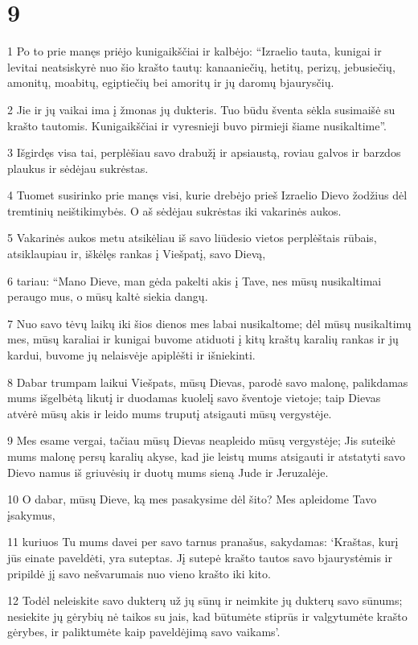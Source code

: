 \chapter{9}


\par 1 Po to prie manęs priėjo kunigaikščiai ir kalbėjo: “Izraelio tauta, kunigai ir levitai neatsiskyrė nuo šio krašto tautų: kanaaniečių, hetitų, perizų, jebusiečių, amonitų, moabitų, egiptiečių bei amoritų ir jų daromų bjaurysčių. 
\par 2 Jie ir jų vaikai ima į žmonas jų dukteris. Tuo būdu šventa sėkla susimaišė su krašto tautomis. Kunigaikščiai ir vyresnieji buvo pirmieji šiame nusikaltime”. 
\par 3 Išgirdęs visa tai, perplėšiau savo drabužį ir apsiaustą, roviau galvos ir barzdos plaukus ir sėdėjau sukrėstas. 
\par 4 Tuomet susirinko prie manęs visi, kurie drebėjo prieš Izraelio Dievo žodžius dėl tremtinių neištikimybės. O aš sėdėjau sukrėstas iki vakarinės aukos. 
\par 5 Vakarinės aukos metu atsikėliau iš savo liūdesio vietos perplėštais rūbais, atsiklaupiau ir, iškėlęs rankas į Viešpatį, savo Dievą, 
\par 6 tariau: “Mano Dieve, man gėda pakelti akis į Tave, nes mūsų nusikaltimai peraugo mus, o mūsų kaltė siekia dangų. 
\par 7 Nuo savo tėvų laikų iki šios dienos mes labai nusikaltome; dėl mūsų nusikaltimų mes, mūsų karaliai ir kunigai buvome atiduoti į kitų kraštų karalių rankas ir jų kardui, buvome jų nelaisvėje apiplėšti ir išniekinti. 
\par 8 Dabar trumpam laikui Viešpats, mūsų Dievas, parodė savo malonę, palikdamas mums išgelbėtą likutį ir duodamas kuolelį savo šventoje vietoje; taip Dievas atvėrė mūsų akis ir leido mums truputį atsigauti mūsų vergystėje. 
\par 9 Mes esame vergai, tačiau mūsų Dievas neapleido mūsų vergystėje; Jis suteikė mums malonę persų karalių akyse, kad jie leistų mums atsigauti ir atstatyti savo Dievo namus iš griuvėsių ir duotų mums sieną Jude ir Jeruzalėje. 
\par 10 O dabar, mūsų Dieve, ką mes pasakysime dėl šito? Mes apleidome Tavo įsakymus, 
\par 11 kuriuos Tu mums davei per savo tarnus pranašus, sakydamas: ‘Kraštas, kurį jūs einate paveldėti, yra suteptas. Jį sutepė krašto tautos savo bjaurystėmis ir pripildė jį savo nešvarumais nuo vieno krašto iki kito. 
\par 12 Todėl neleiskite savo dukterų už jų sūnų ir neimkite jų dukterų savo sūnums; nesiekite jų gėrybių nė taikos su jais, kad būtumėte stiprūs ir valgytumėte krašto gėrybes, ir paliktumėte kaip paveldėjimą savo vaikams’. 
